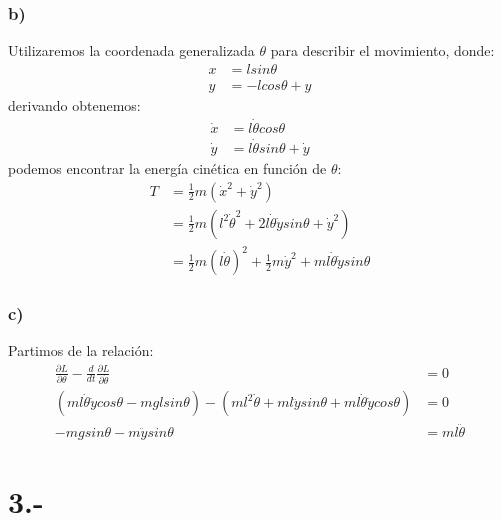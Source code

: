 \documentclass{article}
\begin{document}
\begin{tcolorbox}[breakable]
    \subsubsection*{b)}
    Utilizaremos la coordenada generalizada $\theta$ para describir el movimiento, donde:
    \begin{align*}
        x &= lsin\theta \\ 
        y &= -lcos\theta + y
    \end{align*}
    derivando obtenemos:
    \begin{align*}
        \dot{x} &= l\dot{\theta}cos\theta \\
        \dot{y} &= l\dot{\theta}sin\theta + \dot{y}
    \end{align*}
    podemos encontrar la energía cinética en función de $\theta$:
    \begin{align*}
        T 
        &= \frac{1}{2}m(\dot{x}^2+\dot{y}^2) \\
        &= \frac{1}{2}m(l^2\dot{\theta}^2 + 2l\dot{\theta}\dot{y}sin\theta + \dot{y}^2) \\
        &=  \frac{1}{2}m(l\dot{\theta})^2 + \frac{1}{2}m\dot{y}^2 + ml\dot{\theta}\dot{y}sin\theta
    \end{align*}
    \subsubsection*{c)}
    Partimos de la relación:
    \begin{align*}
        \frac{\partial L}{\partial \theta} - \frac{d}{dt}\frac{\partial L }{\partial \dot{\theta}} &= 0 \\
        (ml\dot{\theta}\dot{y}cos\theta - mglsin\theta) -(ml^2\dot{\theta} + ml\ddot{y}sin\theta + ml\dot{\theta}\dot{y}cos\theta)  &= 0 \\
        -mgsin\theta - m\ddot{y}sin\theta &= ml\ddot{\theta}
    \end{align*}
\end{tcolorbox}

\section*{3.-}
\end{document}
